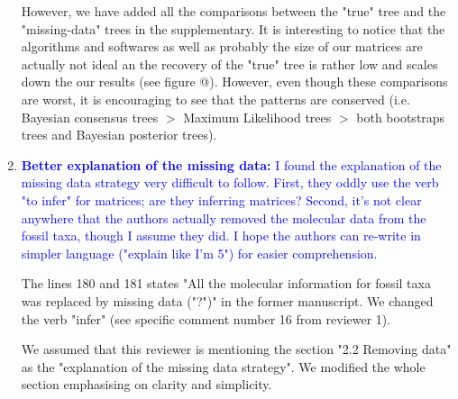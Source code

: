 \documentclass[12pt,letterpaper]{article}
\begin{document}
\begin{enumerate}
However, we have added all the comparisons between the "true" tree and the "missing-data" trees in the supplementary.
It is interesting to notice that the algorithms and softwares as well as probably the size of our matrices are actually not ideal an the recovery of the "true" tree is rather low and scales down the our results (see figure @).
However, even though these comparisons are worst, it is encouraging to see that the patterns are conserved (i.e. Bayesian consensus trees $>$ Maximum Likelihood trees $>$ both bootstraps trees and Bayesian posterior trees).

\item{\textcolor{blue}{\textbf{Better explanation of the missing data:} I found the explanation of the missing data strategy very difficult to follow. First, they oddly use the verb "to infer" for matrices; are they inferring matrices? Second, it's not clear anywhere that the authors actually removed the molecular data from the fossil taxa, though I assume they did. I hope the authors can re-write in simpler language ("explain like I'm 5") for easier comprehension.}}

The lines 180 and 181 states "All the molecular information for fossil taxa was replaced by missing data ("?")" in the former manuscript. We changed the verb "infer" (see specific comment number 16 from reviewer 1).

We assumed that this reviewer is mentioning the section "2.2 Removing data" as the "explanation of the missing data strategy". We modified the whole section emphasising on clarity and simplicity.


\end{enumerate}
\end{document}
